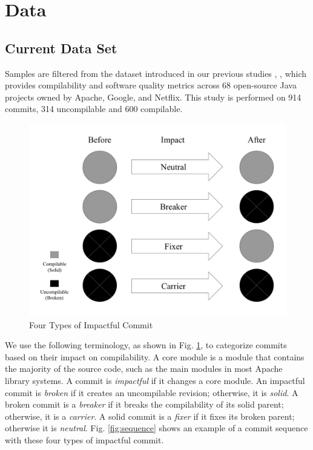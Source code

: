 \section{Data}
\subsection{Current Data Set}
\label{sec:data}

Samples are filtered from the dataset introduced in our previous studies \cite{pooyan_esem}, \cite{pooyan_qrs}, which provides compilability and software quality metrics across 68 open-source Java projects owned by Apache, Google, and Netflix. 
This study is performed on 914 commits, 314 uncompilable and 600 compilable.

\begin{figure}[htbp]
    \centerline{\includegraphics[scale=0.3]{figures/terminology.pdf}}
    \caption{Four Types of Impactful Commit}
    \label{fig:terminology}
    \end{figure}

We use the following terminology, as shown in Fig. \ref{fig:terminology}, to categorize commits based on their impact on compilability. 
A core module is a module that contains the majority of the source code, such as the main modules in most Apache library systems.
A commit is \textit{impactful} if it changes a core module.
An impactful commit is \textit{broken} if it creates an uncompilable revision; otherwise, it is \textit{solid}.
A broken commit is a \textit{breaker} if it breaks the compilability of its solid parent; otherwise, it is a \textit{carrier}.
A solid commit is a \textit{fixer} if it fixes its broken parent; otherwise it is \textit{neutral}.
Fig. \ref{fig:sequence} shows an example of a commit sequence with these four types of impactful commit.

